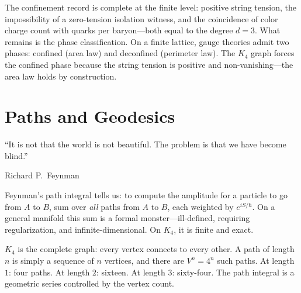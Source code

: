 \documentclass[11pt,a4paper]{book}
\begin{document}
The confinement record is complete at the finite level: positive string tension,
the impossibility of a zero-tension isolation witness, and the coincidence of color
charge count with quarks per baryon---both equal to the degree $d = 3$. What remains is the phase classification.
On a finite lattice, gauge theories admit two phases: confined (area
law) and deconfined (perimeter law). The $K_4$ graph forces the
confined phase because the string tension is positive and
non-vanishing---the area law holds by construction.


\chapter{Paths and Geodesics}
\label{ch:paths-geodesics}

\epigraph{``It is not that the world is not beautiful. The problem is that we have become blind.''}{Richard P.~Feynman}

Feynman's path integral tells us: to compute the amplitude for a particle to go from $A$ to $B$, sum over \emph{all} paths from $A$ to $B$, each weighted by $e^{iS/\hbar}$. On a general manifold this sum is a formal monster---ill-defined, requiring regularization, and infinite-dimensional. On $K_4$, it is finite and exact.

$K_4$ is the complete graph: every vertex connects to every other. A path of length $n$ is simply a sequence of $n$ vertices, and there are $V^n = 4^n$ such paths. At length $1$: four paths. At length $2$: sixteen. At length $3$: sixty-four. The path integral is a geometric series controlled by the vertex count.
\end{document}
